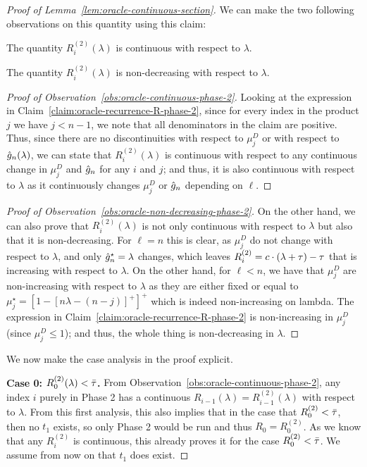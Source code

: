 \begin{proof}[Proof of Lemma~\ref{lem:oracle-continuous-section}]
    We can make the two following observations on this quantity using this claim:
    \begin{observation}\label{obs:oracle-continuous-phase-2}
        The quantity $R_{i}^{(2)}(\lambda)$ is continuous with respect to $\lambda$.
    \end{observation}
    \begin{observation}\label{obs:oracle-non-decreasing-phase-2}
        The quantity $R_{i}^{(2)}(\lambda)$ is non-decreasing with respect to $\lambda$.
    \end{observation}
    \begin{proof}[Proof of Observation~\ref{obs:oracle-continuous-phase-2}]
        Looking at the expression in Claim~\ref{claim:oracle-recurrence-R-phase-2}, since for every index in the product $j$ we have $j<n-1$, we note that all denominators in the claim are positive. Thus, since there are no discontinuities with respect to $\mu_j^D$ or with respect to $\hat{g}_n(\lambda)$, we can state that $R_i^{(2)}(\lambda)$ is continuous with respect to any continuous change in $\mu_j^D$ and $\hat{g}_n$ for any $i$ and $j$; and thus, it is also continuous with respect to $\lambda$ as it continuously changes $\mu_j^D$ or $\hat{g}_n$ depending on $\ell$. 
    \end{proof}
    \begin{proof}[Proof of Observation~\ref{obs:oracle-non-decreasing-phase-2}]
        On the other hand, we can also prove that $R_i^{(2)}(\lambda)$ is not only continuous with respect to $\lambda$ but also that it is non-decreasing. 
        For $\ell=n$ this is clear, as $\mu_j^D$ do not change with respect to $\lambda$, and only $\hat{g}_n^\star=\lambda$ changes, which leaves $R_i^{(2)}=c\cdot (\lambda+\tau)-\tau$ that is increasing with respect to $\lambda$. 
        On the other hand, for $\ell<n$, we have that $\mu_j^D$ are non-increasing with respect to $\lambda$ as they are either fixed or equal to $\mu_j^\star=\left[1-\left[n\lambda - (n-j)\right]^+\right]^+$ which is indeed non-increasing on lambda. 
        The expression in Claim~\ref{claim:oracle-recurrence-R-phase-2} is non-increasing in $\mu_j^D$ (since $\mu_j^D\leq 1$); and thus, the whole thing is non-decreasing in $\lambda$.
    \end{proof}
    
    We now make the case analysis in the proof explicit.

    \smallskip
    \noindent\textbf{Case 0: $R_0^{(2)}(\lambda)<\bar\tau$.}
    From Observation~\ref{obs:oracle-continuous-phase-2}, any index $i$ purely in Phase 2 has a continuous $R_{i-1}(\lambda)=R_{i-1}^{(2)}(\lambda)$ with respect to $\lambda$. From this first analysis, this also implies that in the case that $R_0^{(2)}<\bar\tau$, then no $t_1$ exists, so only Phase 2 would be run and thus $R_0=R_0^{(2)}$. As we know that any $R_i^{(2)}$ is continuous, this already proves it for the case $R_0^{(2)}<\bar\tau$. We assume from now on that $t_1$ does exist.


\end{proof}
